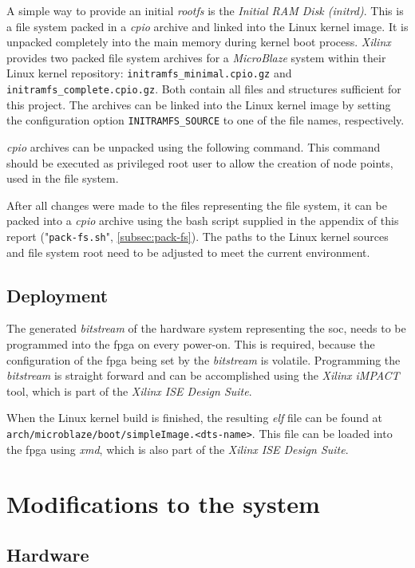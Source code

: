 A simple way to provide an initial \textit{rootfs} is the \textit{Initial RAM Disk (initrd)}. This is a file system packed in a \textit{cpio} archive and linked into the Linux kernel image. It is unpacked completely into the main memory during kernel boot process. \textit{Xilinx} provides two packed file system archives for a \textit{MicroBlaze} system within their Linux kernel repository: \texttt{initramfs\_minimal.cpio.gz} and \texttt{initramfs\_complete.cpio.gz}. Both contain all files and structures sufficient for this project. The archives can be linked into the Linux kernel image by setting the configuration option \texttt{INITRAMFS\_SOURCE} to one of the file names, respectively.

\textit{cpio} archives can be unpacked using the following command. This command should be executed as privileged root user to allow the creation of node points, used in the file system.

After all changes were made to the files representing the file system, it can be packed into a \textit{cpio} archive using the bash script supplied in the appendix of this report ("\texttt{pack-fs.sh}", \ref{subsec:pack-fs}). The paths to the Linux kernel sources and file system root need to be adjusted to meet the current environment.

\section{Deployment}

The generated \textit{bitstream} of the hardware system representing the \gls{soc}, needs to be programmed into the \gls{fpga} on every power-on. This is required, because the configuration of the \gls{fpga} being set by the \textit{bitstream} is volatile. Programming the \textit{bitstream} is straight forward and can be accomplished using the \textit{Xilinx iMPACT} tool, which is part of the \textit{Xilinx ISE Design Suite}.

When the Linux kernel build is finished, the resulting \textit{\gls{elf}} file can be found at \texttt{arch/microblaze/boot/simpleImage.<dts-name>}. This file can be loaded into the \gls{fpga} using \textit{\gls{xmd}}, which is also part of the \textit{Xilinx ISE Design Suite}.

\chapter{Modifications to the system}

\section{Hardware}

